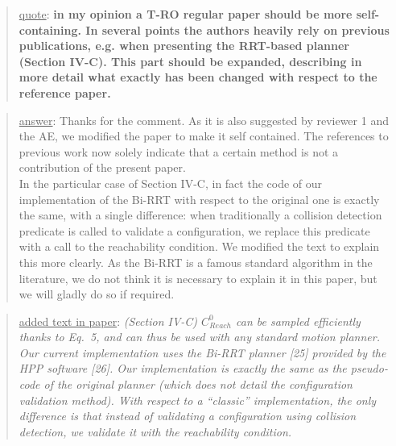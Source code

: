 \documentclass[a4paper]{article}
\newcommand{\done}[0]{}
\newcommand\quot[1]{\begin{quote} \underline{quote}: \textbf{#1}\end{quote}}
\newcommand\as[1]{\begin{quote} \underline{answer}: {#1}\end{quote} }
\newcommand\qt[1]{\begin{quote} \underline{added text in paper}: \textit{#1}\end{quote} \leavevmode \\ }
\begin{document}
\quot{in my opinion a T-RO regular paper should be more self-containing. In several points the authors heavily rely on previous publications, e.g. when presenting the RRT-based planner (Section IV-C). This part should be expanded, describing in more detail what exactly has been changed with respect to the reference paper. }
\as{Thanks for the comment. As it is also suggested by reviewer 1 and the AE, we modified the paper to make it self contained. The references to previous work now solely indicate
that a certain method is not a contribution of the present paper. \\ 
In the particular case of Section IV-C, in fact the code of our implementation of the Bi-RRT with respect to the original one is exactly the same, with a single difference: when
traditionally a collision detection predicate is called to validate a configuration, we replace this predicate with a call to the reachability condition. We modified the text to explain this more clearly. As the Bi-RRT is a famous standard algorithm in the literature, we do not think it is necessary to explain it in this paper, but we will gladly do so if required. }
\qt{(Section IV-C) $C_{Reach}^0$ can be sampled efficiently thanks to Eq.~5, and can thus be used with any standard motion planner.
Our current implementation uses the Bi-RRT planner [25] provided by the HPP software [26].
Our implementation is exactly the same as the pseudo-code of the original planner (which does not detail the configuration validation method). With respect to a ``classic'' implementation, the only difference is that instead of validating a configuration using collision detection, we validate it with the \textit{reachability condition}.} \done
\end{document}
